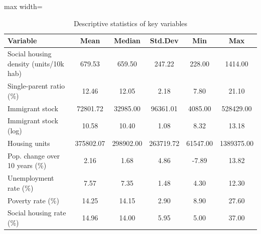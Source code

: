 \begin{table}[ht]
\centering
\caption{Descriptive statistics of key variables} 
\label{tab:desc_stats}
\begin{adjustbox}{max width=\linewidth}
\begin{tabular}{lccccc}
  \toprule
Variable & Mean & Median & Std.Dev & Min & Max \\ 
  \midrule
Social housing density (units/10k hab) & 679.53 & 659.50 & 247.22 & 228.00 & 1414.00 \\ 
  Single-parent ratio (\%) & 12.46 & 12.05 & 2.18 & 7.80 & 21.10 \\ 
  Immigrant stock & 72801.72 & 32985.00 & 96361.01 & 4085.00 & 528429.00 \\ 
  Immigrant stock (log) & 10.58 & 10.40 & 1.08 & 8.32 & 13.18 \\ 
  Housing units & 375802.07 & 298902.00 & 263719.72 & 61547.00 & 1389375.00 \\ 
  Pop. change over 10 years (\%) & 2.16 & 1.68 & 4.86 & -7.89 & 13.82 \\ 
  Unemployment rate (\%) & 7.57 & 7.35 & 1.48 & 4.30 & 12.30 \\ 
  Poverty rate (\%) & 14.25 & 14.15 & 2.90 & 8.90 & 27.60 \\ 
  Social housing rate (\%) & 14.96 & 14.00 & 5.95 & 5.00 & 37.00 \\ 
   \bottomrule
\end{tabular}
\end{adjustbox}
\end{table}
